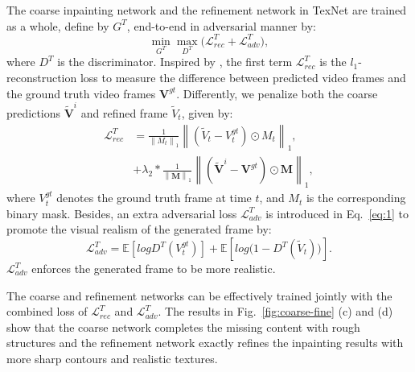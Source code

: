 The coarse inpainting network and the refinement network in TexNet are trained as a whole, define by $G^T$, end-to-end in adversarial manner by:
%
\begin{equation}
	\label{eq:1}
	\min\limits_{G^T} \max \limits_{D^T} \big(\mathcal{L}^{T}_{rec}+\mathcal{L}^T_{adv}\big),
\end{equation}
where $D^T$ is the discriminator.
%
Inspired by \cite{nazeri2019edgeconnect}, the first term $\mathcal{L}^{T}_{rec}$ is the $l_1$-reconstruction loss to measure the difference between predicted video frames and the ground truth video frames $\boldsymbol{V}^{gt}$.
Differently, we penalize both the coarse predictions $\boldsymbol{\widetilde{V}}^i$ and refined frame $\widetilde{V}_t$, given by:
\begin{equation}
		\label{eq:loss_rec}
	\begin{aligned}
		\mathcal{L}^{T}_{rec}&=\frac{1}{\left\|M_t \right\|_1}\left\|(\widetilde{V}_t-V^{gt}_t)\odot M_t\right\|_1,\\ 
		&+\lambda_2*\frac{1}{\left\|\boldsymbol{M} \right\|_1}\left\|(\boldsymbol{\widetilde{V}}^i-\boldsymbol{V}^{gt})\odot \boldsymbol{M}\right\|_1,
	\end{aligned}
\end{equation}
where $V^{gt}_t$ denotes the ground truth frame at time $t$, and $M_t$ is the corresponding binary mask. 
%
%
Besides, an extra adversarial loss $\mathcal{L}^T_{adv}$ is introduced in Eq.~\eqref{eq:1} to promote the visual realism of the generated frame
 by:
	\begin{equation}
		\label{eq:inp_adver}
		\mathcal{L}^T_{adv}=\mathbb{E}[logD^T(V^{gt}_t)]+\mathbb{E}[log\big(1-D^T(\widetilde{V}_t)\big)].
	\end{equation}
$\mathcal{L}^T_{adv}$ enforces the generated frame to be more realistic.


The coarse and refinement networks can be effectively trained jointly with the combined loss of $\mathcal{L}^T_{rec}$ and $\mathcal{L}^T_{adv}$.
The results in Fig.~\ref{fig:coarse-fine} (c) and (d) show that the coarse network completes the missing content with rough structures and the refinement network exactly refines the inpainting results with more sharp contours and realistic textures.




